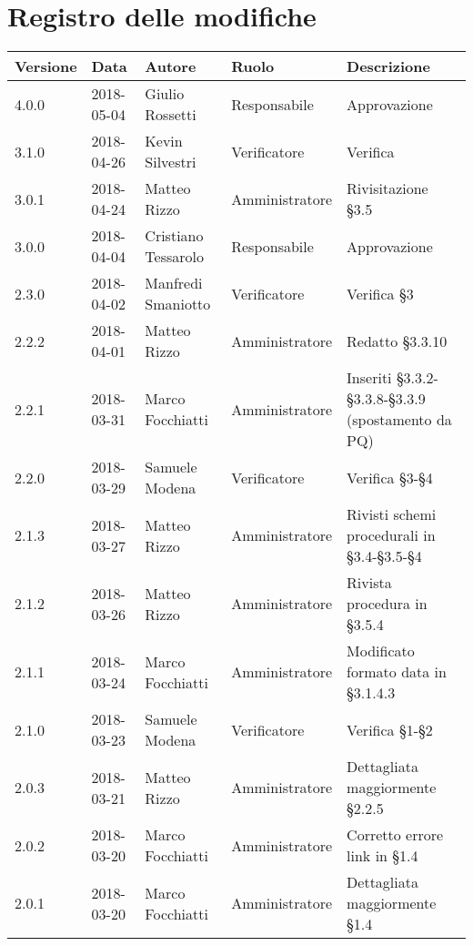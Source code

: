 \documentclass[./NormediProgetto.tex]{subfiles}
\begin{document}
\chapter*{Registro delle modifiche}
\setlength\LTleft{-22mm}
\begin{longtable}{|p{20mm}|p{20mm}|p{40mm}|p{30mm}|p{50mm}|}
	\hline
	\textbf{Versione} & \textbf{Data} & \textbf{Autore} & \textbf{Ruolo} & \textbf{Descrizione} \\ \hline 

		4.0.0 & 2018-05-04 & Giulio Rossetti & Responsabile & Approvazione\\ \hline
		3.1.0 & 2018-04-26 & Kevin Silvestri & Verificatore & Verifica\\ \hline
		3.0.1 & 2018-04-24 & Matteo Rizzo & Amministratore & Rivisitazione §3.5\\ \hline
		3.0.0 & 2018-04-04 & Cristiano Tessarolo & Responsabile & Approvazione\\ \hline
		2.3.0 & 2018-04-02 & Manfredi Smaniotto & Verificatore &  Verifica §3\\ \hline
		2.2.2 & 2018-04-01 & Matteo Rizzo & Amministratore &  Redatto §3.3.10\\ \hline
		2.2.1 & 2018-03-31 & Marco Focchiatti & Amministratore &  Inseriti §3.3.2-§3.3.8-§3.3.9 (spostamento da PQ)\\ \hline
		2.2.0 & 2018-03-29 & Samuele Modena & Verificatore &  Verifica §3-§4\\ \hline
		2.1.3 & 2018-03-27 & Matteo Rizzo & Amministratore &  Rivisti schemi procedurali in §3.4-§3.5-§4\\ \hline
		2.1.2 & 2018-03-26 & Matteo Rizzo & Amministratore &  Rivista procedura in §3.5.4\\ \hline
		2.1.1 & 2018-03-24 & Marco Focchiatti & Amministratore &  Modificato formato data in §3.1.4.3\\ \hline
		2.1.0 & 2018-03-23 & Samuele Modena & Verificatore &  Verifica §1-§2\\ \hline
		2.0.3 & 2018-03-21 & Matteo Rizzo & Amministratore &  Dettagliata maggiormente §2.2.5\\ \hline
		2.0.2 & 2018-03-20 & Marco Focchiatti & Amministratore &  Corretto errore link in §1.4\\ \hline
		2.0.1 & 2018-03-20 & Marco Focchiatti & Amministratore &  Dettagliata maggiormente §1.4\\ 
		
		\hline
		

\end{longtable}
\end{document}
